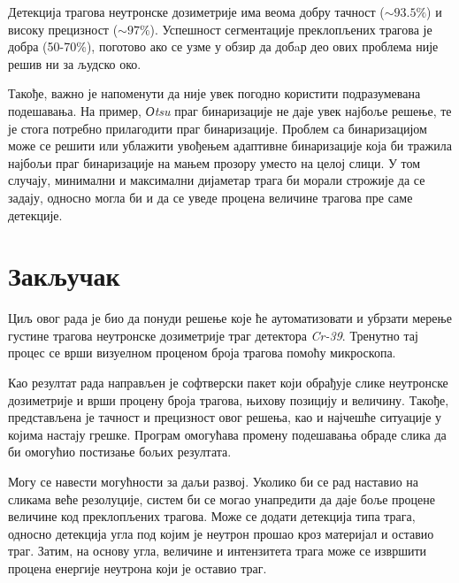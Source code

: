 \documentclass[11pt,a4paper,serbian,oneside]{book}
\begin{document}
Детекција трагова неутронске дозиметрије има веома добру тачност ($\sim93.5\%$) и  високу прецизност ($\sim97\%$). Успешност сегментације преклопљених трагова је добра (50-70\%), поготово ако се узме у обзир да добaр део ових проблема није решив ни за људско око.

Такође, важно је напоменути да није увек погодно користити подразумевана подешавања. На пример, \textit{Оtsu} праг бинаризације не даје увек најбоље решење, те је стога потребно прилагодити праг бинаризације. Проблем са бинаризацијом може се решити или ублажити увођењем адаптивне бинаризације која би тражила најбољи праг бинаризације на мањем прозору уместо на целој слици. У том случају, минимални и максимални дијаметар трага би морали строжије да се задају, односно могла би и да се уведе процена величине трагова пре саме детекције.

%
%
%

\chapter{Закључак}

Циљ овог рада је био да понуди решење које ће аутоматизовати и убрзати мерење густине трагова неутронске дозиметрије траг детектора \textit{Cr-39}. Тренутно тај процес се врши визуелном проценом броја трагова помоћу микроскопа.

Као резултат рада направљен је софтверски пакет који обрађује слике неутронске до\-зи\-мет\-ри\-је и врши процену броја трагова, њихову позицију и величину. Такође, представљена је тачност и прецизност овог решења, као и најчешће ситуације у којима настају грешке. Програм омогућава промену подешавања обраде слика да би омогућио постизање бољих резултата.

Могу се навести могућности за даљи развој. Уколико би се рад наставио на сликама веће резолуције, систем би се могао унапредити да даје боље процене величине код преклопљених трагова. Може се додати детекција типа трага, односно детекција угла под којим је неутрон прошао кроз материјал и оставио траг. Затим, на основу угла, величине и интензитета трага може се извршити процена енергије неутрона који је оставио траг.  

%
%
%
\end{document}
